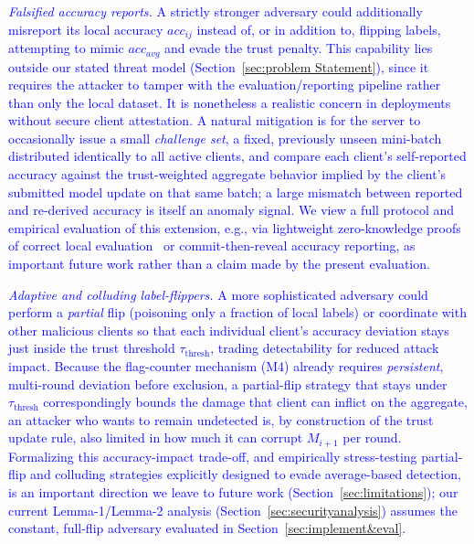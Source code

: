 \documentclass[conference]{IEEEtran}
\begin{document}
\textcolor{blue}{\textit{Falsified accuracy reports.} A strictly stronger adversary could additionally misreport its local accuracy $acc_{ij}$ instead of, or in addition to, flipping labels, attempting to mimic $acc_{avg}$ and evade the trust penalty. This capability lies outside our stated threat model (Section~\ref{sec:problem Statement}), since it requires the attacker to tamper with the evaluation/reporting pipeline rather than only the local dataset. It is nonetheless a realistic concern in deployments without secure client attestation. A natural mitigation is for the server to occasionally issue a small \emph{challenge set}, a fixed, previously unseen mini-batch distributed identically to all active clients, and compare each client's self-reported accuracy against the trust-weighted aggregate behavior implied by the client's submitted model update on that same batch; a large mismatch between reported and re-derived accuracy is itself an anomaly signal. We view a full protocol and empirical evaluation of this extension, e.g., via lightweight zero-knowledge proofs of correct local evaluation~\cite{shen2024lfrppfl} or commit-then-reveal accuracy reporting, as important future work rather than a claim made by the present evaluation.}

\textcolor{blue}{\textit{Adaptive and colluding label-flippers.} A more sophisticated adversary could perform a \emph{partial} flip (poisoning only a fraction of local labels) or coordinate with other malicious clients so that each individual client's accuracy deviation stays just inside the trust threshold $\tau_{\text{thresh}}$, trading detectability for reduced attack impact. Because the flag-counter mechanism (M4) already requires \emph{persistent}, multi-round deviation before exclusion, a partial-flip strategy that stays under $\tau_{\text{thresh}}$ correspondingly bounds the damage that client can inflict on the aggregate, an attacker who wants to remain undetected is, by construction of the trust update rule, also limited in how much it can corrupt $M_{i+1}$ per round. Formalizing this accuracy-impact trade-off, and empirically stress-testing partial-flip and colluding strategies explicitly designed to evade average-based detection, is an important direction we leave to future work (Section~\ref{sec:limitations}); our current Lemma-1/Lemma-2 analysis (Section~\ref{sec:securityanalysis}) assumes the constant, full-flip adversary evaluated in Section~\ref{sec:implement&eval}.}
\end{document}
